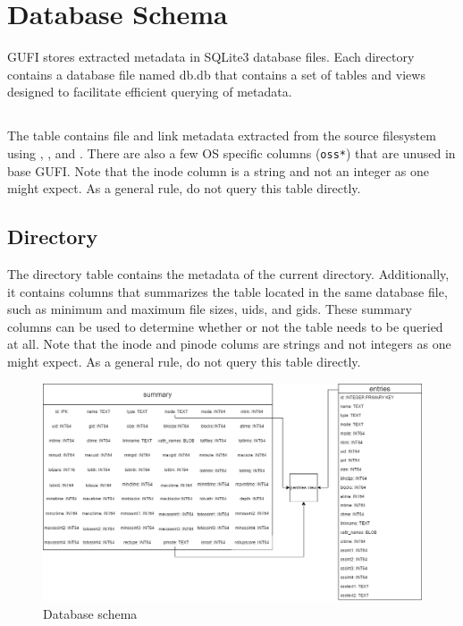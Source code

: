 \section{Database Schema}
\label{sec:schema}
GUFI stores extracted metadata in SQLite3 database files. Each
directory contains a database file named db.db that contains a set of
tables and views designed to facilitate efficient querying of
metadata.

\subsection{\entries}
The \entries table contains file and link metadata extracted from the
source filesystem using \stat, \readlink, and \listxattr. There are
also a few OS specific columns (\texttt{oss*}) that are unused in base
GUFI. Note that the inode column is a string and not an integer as one
might expect. As a general rule, do not query this table directly.

\subsection{Directory \summary}
The directory \summary table contains the metadata of the current
directory. Additionally, it contains columns that summarizes the
\entries table located in the same database file, such as minimum and
maximum file sizes, uids, and gids. These summary columns can be used
to determine whether or not the \entries table needs to be queried at
all. Note that the inode and pinode colums are strings and not
integers as one might expect. As a general rule, do not query this
table directly.

\begin{figure} [h!]
\centering
\includegraphics[width=1.0\textwidth]{images/Database_Schemas.png}
\caption{\label{fig:Database Schema}Database schema}
\end{figure}

